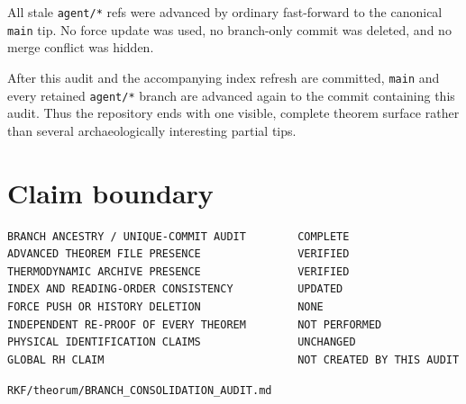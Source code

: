 All stale \texttt{agent/*} refs were advanced by ordinary fast-forward to the canonical \texttt{main} tip. No force update was used, no branch-only commit was deleted, and no merge conflict was hidden.

After this audit and the accompanying index refresh are committed, \texttt{main} and every retained \texttt{agent/*} branch are advanced again to the commit containing this audit. Thus the repository ends with one visible, complete theorem surface rather than several archaeologically interesting partial tips.

\hypertarget{claim-boundary}{%
\section{Claim boundary}\label{claim-boundary}}

\begin{verbatim}
BRANCH ANCESTRY / UNIQUE-COMMIT AUDIT        COMPLETE
ADVANCED THEOREM FILE PRESENCE               VERIFIED
THERMODYNAMIC ARCHIVE PRESENCE               VERIFIED
INDEX AND READING-ORDER CONSISTENCY          UPDATED
FORCE PUSH OR HISTORY DELETION               NONE
INDEPENDENT RE-PROOF OF EVERY THEOREM        NOT PERFORMED
PHYSICAL IDENTIFICATION CLAIMS               UNCHANGED
GLOBAL RH CLAIM                              NOT CREATED BY THIS AUDIT
\end{verbatim}

\begin{flushright}\small\texttt{RKF/theorum/BRANCH\_CONSOLIDATION\_AUDIT.md}\end{flushright}
